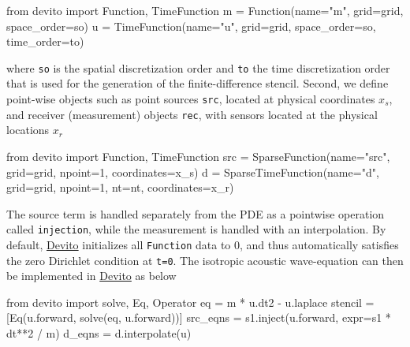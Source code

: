 \documentclass[conference]{IEEEtran}
\newenvironment{Shaded}{}{}
\newcommand{\DecValTok}[1]{\textcolor[rgb]{0.25,0.63,0.44}{{#1}}}
\newcommand{\CharTok}[1]{\textcolor[rgb]{0.25,0.44,0.63}{{#1}}}
\newcommand{\StringTok}[1]{\textcolor[rgb]{0.25,0.44,0.63}{{#1}}}
\newcommand{\NormalTok}[1]{{#1}}
\begin{document}
\begin{Shaded}
\begin{Highlighting}[]
\CharTok{from} \NormalTok{devito }\CharTok{import} \NormalTok{Function, TimeFunction}
\NormalTok{m = Function(name=}\StringTok{"m"}\NormalTok{, grid=grid, space_order=so)}
\NormalTok{u = TimeFunction(name=}\StringTok{"u"}\NormalTok{, grid=grid, space_order=so, time_order=to)}
\end{Highlighting}
\end{Shaded}

where \texttt{so} is the spatial discretization order and \texttt{to}
the time discretization order that is used for the generation of the
finite-difference stencil. Second, we define point-wise objects such as
point sources \texttt{src}, located at physical coordinates $x_s$, and
receiver (measurement) objects \texttt{rec}, with sensors located at the
physical locations $x_r$

\begin{Shaded}
\begin{Highlighting}[]
\CharTok{from} \NormalTok{devito }\CharTok{import} \NormalTok{Function, TimeFunction}
\NormalTok{src = SparseFunction(name=}\StringTok{"src"}\NormalTok{, grid=grid, npoint=}\DecValTok{1}\NormalTok{, coordinates=x_s)}
\NormalTok{d = SparseTimeFunction(name=}\StringTok{"d"}\NormalTok{, grid=grid, npoint=}\DecValTok{1}\NormalTok{, nt=nt, coordinates=x_r)}
\end{Highlighting}
\end{Shaded}

The source term is handled separately from the PDE as a pointwise
operation called \texttt{injection}, while the measurement is handled
with an interpolation. By default,
\href{https://github.com/devitocodes/devito}{Devito} initializes all
\texttt{Function} data to 0, and thus automatically satisfies the zero
Dirichlet condition at \texttt{t=0}. The isotropic acoustic
wave-equation can then be implemented in
\href{https://github.com/devitocodes/devito}{Devito} as below

\begin{Shaded}
\begin{Highlighting}[]
\CharTok{from} \NormalTok{devito }\CharTok{import} \NormalTok{solve, Eq, Operator}
\NormalTok{eq = m * u.dt2 - u.laplace}
\NormalTok{stencil = [Eq(u.forward, solve(eq, u.forward))]}
\NormalTok{src_eqns = s1.inject(u.forward, expr=s1 * dt**}\DecValTok{2} \NormalTok{/ m)}
\NormalTok{d_eqns = d.interpolate(u)}
\end{Highlighting}
\end{Shaded}
\end{document}
